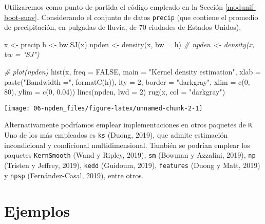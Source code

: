 \documentclass[
]{book}
\newenvironment{Shaded}{\begin{snugshade}}{\end{snugshade}}
\newcommand{\AttributeTok}[1]{\textcolor[rgb]{0.77,0.63,0.00}{#1}}
\newcommand{\CommentTok}[1]{\textcolor[rgb]{0.56,0.35,0.01}{\textit{#1}}}
\newcommand{\ConstantTok}[1]{\textcolor[rgb]{0.00,0.00,0.00}{#1}}
\newcommand{\DecValTok}[1]{\textcolor[rgb]{0.00,0.00,0.81}{#1}}
\newcommand{\FloatTok}[1]{\textcolor[rgb]{0.00,0.00,0.81}{#1}}
\newcommand{\FunctionTok}[1]{\textcolor[rgb]{0.00,0.00,0.00}{#1}}
\newcommand{\NormalTok}[1]{#1}
\newcommand{\OtherTok}[1]{\textcolor[rgb]{0.56,0.35,0.01}{#1}}
\newcommand{\StringTok}[1]{\textcolor[rgb]{0.31,0.60,0.02}{#1}}
\theoremstyle{break}
\theoremstyle{definition}
\theoremstyle{definition}
\theoremstyle{definition}
\theoremstyle{definition}
\theoremstyle{remark}
\begin{document}
Utilizaremos como punto de partida el código empleado en la Sección \ref{modunif-boot-suav}.
Considerando el conjunto de datos \texttt{precip} (que contiene el promedio de precipitación,
en pulgadas de lluvia, de 70 ciudades de Estados Unidos).

\begin{Shaded}
\begin{Highlighting}[]
\NormalTok{x }\OtherTok{\textless{}{-}}\NormalTok{ precip}
\NormalTok{h }\OtherTok{\textless{}{-}} \FunctionTok{bw.SJ}\NormalTok{(x)}
\NormalTok{npden }\OtherTok{\textless{}{-}} \FunctionTok{density}\NormalTok{(x, }\AttributeTok{bw =}\NormalTok{ h)}
\CommentTok{\# npden \textless{}{-} density(x, bw = "SJ")}

\CommentTok{\# plot(npden)}
\FunctionTok{hist}\NormalTok{(x, }\AttributeTok{freq =} \ConstantTok{FALSE}\NormalTok{, }\AttributeTok{main =} \StringTok{"Kernel density estimation"}\NormalTok{,}
     \AttributeTok{xlab =} \FunctionTok{paste}\NormalTok{(}\StringTok{"Bandwidth ="}\NormalTok{, }\FunctionTok{formatC}\NormalTok{(h)), }\AttributeTok{lty =} \DecValTok{2}\NormalTok{,}
     \AttributeTok{border =} \StringTok{"darkgray"}\NormalTok{, }\AttributeTok{xlim =} \FunctionTok{c}\NormalTok{(}\DecValTok{0}\NormalTok{, }\DecValTok{80}\NormalTok{), }\AttributeTok{ylim =} \FunctionTok{c}\NormalTok{(}\DecValTok{0}\NormalTok{, }\FloatTok{0.04}\NormalTok{))}
\FunctionTok{lines}\NormalTok{(npden, }\AttributeTok{lwd =} \DecValTok{2}\NormalTok{)}
\FunctionTok{rug}\NormalTok{(x, }\AttributeTok{col =} \StringTok{"darkgray"}\NormalTok{)}
\end{Highlighting}
\end{Shaded}

\begin{center}\texttt{[image: 06-npden\_files/figure-latex/unnamed-chunk-2-1]} \end{center}

Alternativamente podríamos emplear implementaciones en otros paquetes de \texttt{R}.
Uno de los más empleados es \texttt{ks} (Duong, 2019), que admite estimación
incondicional y condicional multidimensional.
También se podrían emplear los paquetes \texttt{KernSmooth} (Wand y Ripley, 2019),
\texttt{sm} (Bowman y Azzalini, 2019), \texttt{np} (Tristen y Jeffrey, 2019),
\texttt{kedd} (Guidoum, 2019), \texttt{features} (Duong y Matt, 2019) y \texttt{npsp} (Fernández-Casal, 2019),
entre otros.

\hypertarget{ejemplos-1}{%
\section{Ejemplos}\label{ejemplos-1}}
\end{document}
